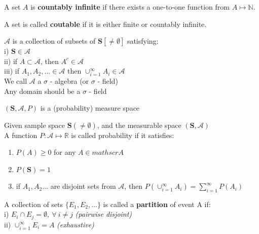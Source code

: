 \documentclass[12pt, oneside, letterpaper]{notes}
\begin{document}
\begin{mydef}
	A set $A$ is \textbf{countably infinite} if there exists a one-to-one
	function from $A \mapsto \mathbb{N}$.
\end{mydef}

\begin{mydef}
	A set is called \textbf{coutable} if it is either finite or countably 
	infinite.
\end{mydef}

%
%

\begin{mydef}
	$\mathscr{A}$ is a collection of subsets of $\textbf{S}[\neq \emptyset]$
	satisfying: \\
	\indent i) $\textbf{S} \in \mathscr{A}$ \\
	\indent ii) if $ A \subset \mathscr{A}$, then $A^c \in \mathscr{A}$ \\
	\indent iii) if $A_1, A_2, ... \in \mathscr{A}$ then 
	$\cup_{i=1}^{\infty} A_i \in \mathscr{A} $ \\
	We call $\mathscr{A}$ a $\sigma$ - algebra (or $\sigma$ - field) \\
	Any domain should be a $\sigma$ - field
\end{mydef}

\begin{mydef}
	$(\textbf{S}, \mathscr{A}, P)$ is a (probability) measure space
\end{mydef}

\begin{mydef}
	Given sample space $\textbf{S} (\neq \emptyset)$, and the 
	measurable space $(\textbf{S}, \mathscr{A})$ \\
	A function $P: \mathscr{A} \mapsto \mathbb{R}$ is called 
	probability if it satisfies:
	\begin{enumerate}
		\item $P(A) \geq 0$ for any $A \in mathscr{A}$
		\item $P(\textbf{S}) = 1$
		\item if $A_1, A_2 ...$ are disjoint sets from $\mathscr{A}$,
		then $P(\cup_{i=1}^{\infty} A_i) = \sum_{i=1}^{\infty} P(A_i)$
	\end{enumerate}
\end{mydef}

%
%

\begin{mydef}
	A collection of sets $\{E_1, E_2, ...\}$ is called a \textbf{partition} 
		of event A if: \\
	\indent i) $E_i \cap E_j = \emptyset, \: \forall \: i \neq j$ 
		\textit{(pairwise disjoint)} \\
  	\indent ii) $\cup_{i=1}^{\infty}E_i = A$ 
		\textit{(exhaustive)}
\end{mydef}
\end{document}
